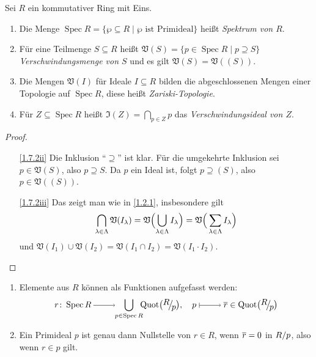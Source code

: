 \documentclass[a4paper,12pt]{scrbook}
\newtheorem{proof}{Beweis}
\def\V{\mathfrak{V}}
\def\I{\mathfrak{I}}
\newcommand{\Spec}{\operatorname{Spec}}
\newcommand{\Quot}{\mathrm{Quot}}
\newcommand{\ra}{\raisebox{-1pt}{\tikz{\draw[thin,shorten >=3pt, ->] (0,0) node{\hspace*{-2pt}} -- node{} (1,0);}}\penalty1000\relax}
\renewcommand{\mapsto}{\raisebox{-1pt}{\tikz{\draw[thin,shorten >=3pt, |->] (0,0) node{\hspace*{0pt}} -- node{} (1,0);}}\penalty1000\relax}
\def\Bar#1{\ensuremath\overline{#1}}
\newcommand{\Quotient}[2]{
  \mathchoice
  { %
    \raisebox{0.7ex}{\ensuremath{#1}}
    \ensuremath{\mkern-3mu}\big/\ensuremath{\mkern-3mu}
    \raisebox{-0.6ex}{\ensuremath{#2}}
  }
  { %
    #1/#2
  }
  { %
    #1/#2
  }
  { %
    #1/#2
  }
}
\begin{document}
\begin{db}\label{1.7.2}
  Sei $R$ ein kommutativer Ring mit Eins.
  \begin{enumerate}
  \item{} Die Menge $\Spec R = \{\wp\subseteq R \mid \wp\text{ ist Primideal}\}$ heißt \emph{Spektrum von $R$}.
  \item{} Für eine Teilmenge $S\subseteq R$ heißt $\V(S) = \{p\in\Spec R \mid p\supseteq S\}$
    \emph{Verschwindungsmenge von $S$} und es gilt $\V(S)=\V((S))$.
  \item{} Die Mengen $\V(I)$ für Ideale $I\subseteq R$ bilden die abgeschlossenen Mengen einer Topologie auf
    $\Spec R$, diese heißt \emph{Zariski-Topologie}.
  \item{} Für $Z\subseteq\Spec R$ heißt $\I(Z)=\displaystyle\bigcap_{p\in Z}p$ das \emph{Verschwindungsideal von
      $Z$}.
  \end{enumerate}
\end{db}
\begin{proof}
  \begin{enumerate}
  \item[\ref{1.7.2ii}] Die Inklusion \enquote{$\supseteq$} ist klar. Für die umgekehrte Inklusion sei $p\in\V(S)$, also
    $p\supseteq S$. Da $p$ ein Ideal ist, folgt $p\supseteq (S)$, also $p\in\V((S))$.
  \item[\ref{1.7.2iii}] Das zeigt man wie in \cref{1.2.1}, insbesondere gilt
    \[\displaystyle\bigcap_{\lambda\in\Lambda}\V(I_\lambda) =
    \V\Bigl(\bigcup_{\lambda\in\Lambda}I_\lambda\Bigr)=\V\Bigr(\sum_{\lambda\in\Lambda}I_\lambda\Bigr)\] und
    $\V(I_1)\cup\V(I_2)=\V(I_1\cap I_2)=\V(I_1\cdot I_2)$.
  \end{enumerate}
\end{proof}

\begin{db}\label{1.7.3}
  \begin{enumerate}
  \item{} Elemente aus $R$ können als Funktionen aufgefasst werden:
    \[ r\colon \Spec R \ra \!\!\!\bigcup_{p\in\Spec R}\!\!\! \Quot\bigl(\Quotient{R}{p}\bigr),\quad
    p\mapsto\Bar{r}\in\Quot\bigl(\Quotient{R}{p}\bigr) \]
  \item{} Ein Primideal $p$ ist genau dann Nullstelle von $r\in R$, wenn $\Bar{r}=0$ in $\Quotient{R}{p}$, also wenn
    $r\in p$ gilt.
  \end{enumerate}
\end{db}
\end{document}
